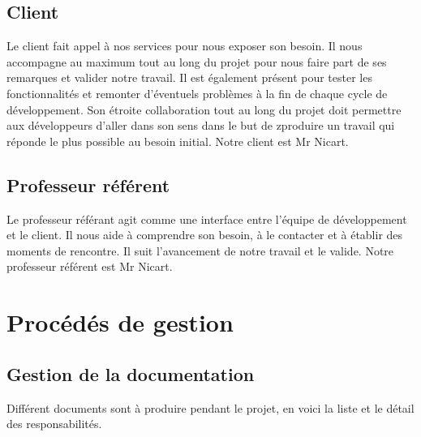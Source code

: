 \documentclass{../res/univ-projet}
\begin{document}
  \subsection{Client}
    Le client fait appel à nos services pour nous exposer son besoin. Il nous accompagne au maximum tout au long du projet pour nous faire part de ses remarques et valider notre travail. Il est également présent pour tester les fonctionnalités et remonter d’éventuels problèmes à la fin de chaque cycle de développement. Son étroite collaboration tout au long du projet doit permettre aux développeurs d’aller dans son sens dans le but de zproduire un travail qui réponde le plus possible au besoin initial.
      Notre client est Mr Nicart.
  \subsection{Professeur référent}
    Le professeur référant agit comme une interface entre l'équipe de développement et le client. Il nous aide à comprendre son besoin, à le contacter et à établir des moments de rencontre. Il suit l'avancement de notre travail et le valide. Notre professeur référent est Mr Nicart.

  \newpage
\section{Procédés de gestion}
  \subsection{Gestion de la documentation}
    Différent documents sont à produire pendant le projet, en voici la liste et le détail des responsabilités.\\
\end{document}
